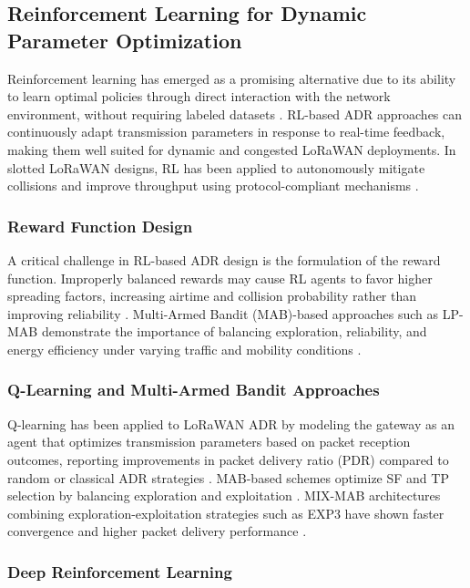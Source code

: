 \documentclass[12pt,a4paper]{article}
\begin{document}
\subsection{Reinforcement Learning for Dynamic Parameter Optimization}

Reinforcement learning has emerged as a promising alternative due to its ability to learn optimal policies through direct interaction with the network environment, without requiring labeled datasets \cite{Zholamanov2024, Djoudi2022mdp}. RL-based ADR approaches can continuously adapt transmission parameters in response to real-time feedback, making them well suited for dynamic and congested LoRaWAN deployments. In slotted LoRaWAN designs, RL has been applied to autonomously mitigate collisions and improve throughput using protocol-compliant mechanisms \cite{Slabicki2020adaptive}.

\subsubsection{Reward Function Design}

A critical challenge in RL-based ADR design is the formulation of the reward function. Improperly balanced rewards may cause RL agents to favor higher spreading factors, increasing airtime and collision probability rather than improving reliability \cite{Zholamanov2024}. Multi-Armed Bandit (MAB)-based approaches such as LP-MAB demonstrate the importance of balancing exploration, reliability, and energy efficiency under varying traffic and mobility conditions \cite{Djoudi2022mdp, Sandoval2020rl}.

\subsubsection{Q-Learning and Multi-Armed Bandit Approaches}

Q-learning has been applied to LoRaWAN ADR by modeling the gateway as an agent that optimizes transmission parameters based on packet reception outcomes, reporting improvements in packet delivery ratio (PDR) compared to random or classical ADR strategies \cite{Farhad23-LoRaWAN-Meets-ML, Sandoval2020rl}. MAB-based schemes optimize SF and TP selection by balancing exploration and exploitation \cite{Djoudi2022mdp, Sandoval2020rl}. MIX-MAB architectures combining exploration-exploitation strategies such as EXP3 have shown faster convergence and higher packet delivery performance \cite{Djoudi2022mdp}.

\subsubsection{Deep Reinforcement Learning}
\end{document}
